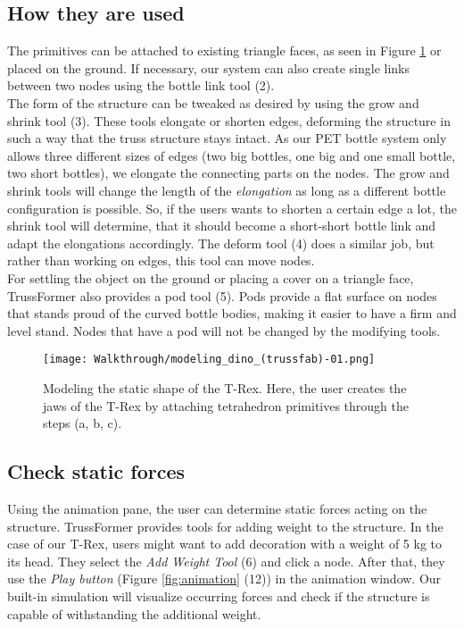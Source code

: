 \subsection{How they are used}
The primitives can be attached to existing triangle faces, as seen in Figure \ref{fig:modelling_t-rex} or placed on the ground. If necessary, our system can also create single links between two nodes using the bottle link tool (2).\\
The form of the structure can be tweaked as desired by using the grow and shrink tool (3). These tools elongate or shorten edges, deforming the structure in such a way that the truss structure stays intact. As our PET bottle system only allows three different sizes of edges (two big bottles, one big and one small bottle, two short bottles), we elongate the connecting parts on the nodes. The grow and shrink tools will change the length of the \textit{elongation} as long as a different bottle configuration is possible. So, if the users wants to shorten a certain edge a lot, the shrink tool will determine, that it should become a short-short bottle link and adapt the elongations accordingly. The deform tool (4) does a similar job, but rather than working on edges, this tool can move nodes.\\
For settling the object on the ground or placing a cover on a triangle face, TrussFormer also provides a pod tool (5). Pods provide a flat surface on nodes that stands proud of the curved bottle bodies, making it easier to have a firm and level stand. Nodes that have a pod will not be changed by the modifying tools.

\begin{figure}[ht!]
    \texttt{[image: Walkthrough/modeling\_dino\_(trussfab)-01.png]}
    \centering
    \caption{Modeling the static shape of the T-Rex. Here, the user creates the jaws of the T-Rex by attaching tetrahedron primitives through the steps (a, b, c).}
    \label{fig:modelling_t-rex}
\end{figure}

\subsection{Check static forces}
Using the animation pane, the user can determine static forces acting on the structure. TrussFormer provides tools for adding weight to the structure. In the case of our T-Rex, users might want to add decoration with a weight of 5 kg to its head. They select the \textit{Add Weight Tool} (6) and click a node. After that, they use the \textit{Play button} (Figure \ref{fig:animation} (12)) in the animation window. Our built-in simulation will visualize occurring forces and check if the structure is capable of withstanding the additional weight.

